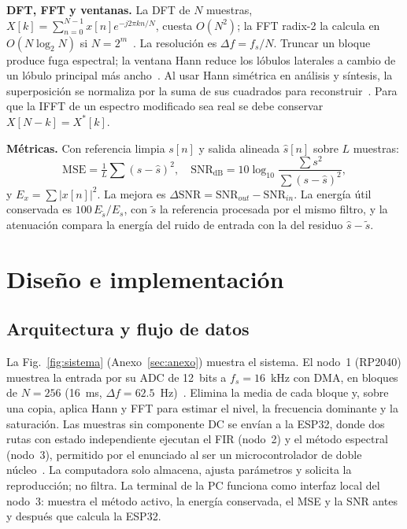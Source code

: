 \documentclass[conference]{IEEEtran}
\begin{document}
\textbf{DFT, FFT y ventanas.} La DFT de $N$ muestras,
$X[k]=\sum_{n=0}^{N-1}x[n]e^{-j2\pi kn/N}$, cuesta $O(N^2)$; la FFT radix-2 la calcula en
$O(N\log_2N)$ si $N=2^m$~\cite{cooley1965}. La resolución es $\Delta f=f_s/N$. Truncar
un bloque produce fuga espectral; la ventana Hann reduce los lóbulos laterales a cambio
de un lóbulo principal más ancho~\cite{harris1978}. Al usar Hann simétrica en análisis
y síntesis, la superposición se normaliza por la suma de sus cuadrados para
reconstruir~\cite{allen1977}. Para que la IFFT de un espectro modificado sea real se debe
conservar $X[N-k]=X^*[k]$.

\textbf{Métricas.} Con referencia limpia $s[n]$ y salida alineada $\hat s[n]$ sobre $L$
muestras:
\begin{equation}
\mathrm{MSE}=\tfrac{1}{L}\textstyle\sum(s-\hat s)^2,\quad
\mathrm{SNR_{dB}}=10\log_{10}\dfrac{\sum s^2}{\sum (s-\hat s)^2},
\end{equation}
y $E_x=\sum|x[n]|^2$. La mejora es $\Delta\mathrm{SNR}=\mathrm{SNR}_{out}-\mathrm{SNR}_{in}$.
La energía útil conservada es $100\,E_{\tilde s}/E_s$, con $\tilde s$ la referencia
procesada por el mismo filtro, y la atenuación compara la energía del ruido de entrada
con la del residuo $\hat s-\tilde s$.

\section{Diseño e implementación}\label{sec:diseno}

\subsection{Arquitectura y flujo de datos}
La Fig.~\ref{fig:sistema} (Anexo~\ref{sec:anexo}) muestra el sistema. El nodo~1 (RP2040) muestrea la entrada
por su ADC de 12~bits a $f_s=16$~kHz con DMA, en bloques de $N=256$ (16~ms,
$\Delta f=62.5$~Hz)~\cite{rp2040}. Elimina la media de cada bloque y, sobre una copia,
aplica Hann y FFT para estimar el nivel, la frecuencia dominante y la saturación. Las
muestras sin componente DC se envían a la ESP32, donde dos rutas con estado
independiente ejecutan el FIR (nodo~2) y el método espectral (nodo~3), permitido por
el enunciado al ser un microcontrolador de doble núcleo~\cite{enunciado,esp32ds}. La
computadora solo almacena, ajusta parámetros y solicita la reproducción; no filtra. La
terminal de la PC funciona como interfaz local del nodo~3: muestra el método activo, la
energía conservada, el MSE y la SNR antes y después que calcula la ESP32.
\end{document}
